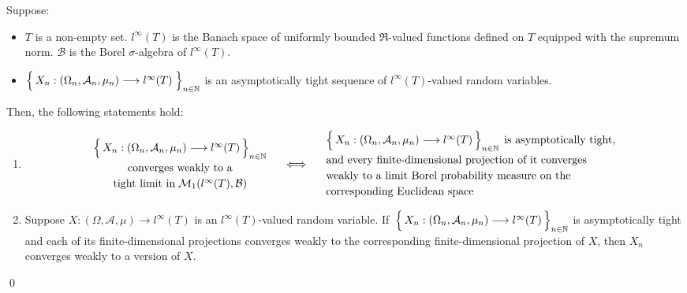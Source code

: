 \begin{theorem}
\mbox{}\vskip 0.1cm
\noindent
Suppose:
\begin{itemize}
\item
	$T$ is a non-empty set.
	$l^{\infty}(T)$ is the Banach space of uniformly bounded $\Re$-valued functions defined on $T$
	equipped with the supremum norm.
	$\mathcal{B}$ is the Borel $\sigma$-algebra of $l^{\infty}(T)$.
\item
	$\left\{\,X_{n} : (\Omega_{n},\mathcal{A}_{n},\mu_{n})
	\overset{{\color{white}-}}{\longrightarrow}l^{\infty}(T)\;\right\}_{n\in\N}$
	is an asymptotically tight sequence of $l^{\infty}(T)$-valued random variables.
\end{itemize}
Then, the following statements hold:
\begin{enumerate}
\item
	\begin{equation*}
		\begin{array}{c}
			\left\{\,
			X_{n} : (\Omega_{n},\mathcal{A}_{n},\mu_{n})
			\overset{{\color{white}-}}{\longrightarrow}
			l^{\infty}(T)\,\right\}_{n\in\N}
		\\
			\overset{{\color{white}.}}{\textnormal{converges weakly to a}}
		\\
			\overset{{\color{white}.}}{\textnormal{tight limit in}}\; \mathcal{M}_{1}\!\left(l^{\infty}(T),\mathcal{B}\right)
		\end{array}
	\quad\Longleftrightarrow\quad
		\begin{array}{l}
			\left\{\,
			X_{n} : (\Omega_{n},\mathcal{A}_{n},\mu_{n})
			\overset{{\color{white}-}}{\longrightarrow}
			l^{\infty}(T)\,\right\}_{n\in\N}
			\;\textnormal{is asymptotically tight,}
		\\
			\overset{{\color{white}.}}{\textnormal{and every finite-dimensional projection of it converges}}
		\\
			\overset{{\color{white}.}}{\textnormal{weakly to a limit Borel probability measure on the}}
		\\
			\overset{{\color{white}.}}{\textnormal{corresponding Euclidean space}}
		\end{array}
	\end{equation*}
\item
	Suppose
	$X : (\Omega,\mathcal{A},\mu) \longrightarrow l^{\infty}(T)$
	is an $l^{\infty}(T)$-valued random variable.
	If
	\,$\left\{\,X_{n} : (\Omega_{n},\mathcal{A}_{n},\mu_{n})
	\overset{{\color{white}-}}{\longrightarrow}l^{\infty}(T)\,\right\}_{n\in\N}$
	is asymptotically tight and each of its finite-dimensional projections converges weakly to
	the corresponding finite-dimensional projection of $X$,
	then $X_{n}$ converges weakly to a version of $X$.
\end{enumerate}
\end{theorem}
\proof
\qed


\renewcommand{\theenumi}{\roman{enumi}}
\renewcommand{\labelenumi}{\textnormal{(\theenumi)}$\;\;$}

